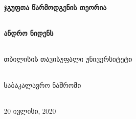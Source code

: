 \documentclass[12pt]{article}
\begin{document}
\begin{titlepage}
	\begin{center}
		\vspace*{1cm}
		\Huge
		\textbf{ჯგუფთა წარმოდგენის თეორია}
		
		\vspace{1cm} \ \\
		\Large
		\textbf{ანდრო ნიდენს}
		
		
		\vspace{2cm} \ \\
		\large
		თბილისის თავისუფალი უნივერსიტეტი
		
		\vspace{1cm} \ \\
		საბაკალავრო ნაშრომი
		
		\vspace{1cm} \ \\
		\vfill
		20 ივლისი, 2020
		
	\end{center}
\end{titlepage}

\newpage
\leavevmode\thispagestyle{empty}\newpage
\tableofcontents
\newpage
\end{document}
